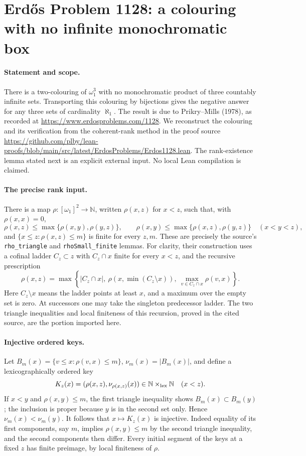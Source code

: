 \section*{Erd\H{o}s Problem 1128: a colouring with no infinite monochromatic box}

\paragraph{Statement and scope.}
There is a two-colouring of \(\omega_1^3\) with no monochromatic product of three countably infinite sets. Transporting this colouring by bijections gives the negative answer for any three sets of cardinality \(\aleph_1\).
The result is due to Prikry--Mills (1978), as recorded at \url{https://www.erdosproblems.com/1128}.
We reconstruct the colouring and its verification from the coherent-rank method in the proof source
\url{https://github.com/plby/lean-proofs/blob/main/src/latest/ErdosProblems/Erdos1128.lean}.
The rank-existence lemma stated next is an explicit external input. No local Lean compilation is claimed.

\paragraph{The precise rank input.}
There is a map \(\rho:[\omega_1]^2\to\mathbb N\), written \(\rho(x,z)\) for \(x<z\), such that, with \(\rho(x,x)=0\),
\[
 \rho(x,z)\leq\max\{\rho(x,y),\rho(y,z)\},\qquad
 \rho(x,y)\leq\max\{\rho(x,z),\rho(y,z)\}
 \quad(x<y<z),
\]
and \(\{x\leq z:\rho(x,z)\leq m\}\) is finite for every \(z,m\).
These are precisely the source's \texttt{rho\_triangle} and \texttt{rhoSmall\_finite} lemmas.
For clarity, their construction uses a cofinal ladder \(C_z\subset z\) with \(C_z\cap x\) finite for every \(x<z\), and the recursive prescription
\[
 \rho(x,z)=\max\left\{
 |C_z\cap x|,\ 
 \rho(x,\min(C_z\setminus x)),\
 \max_{v\in C_z\cap x}\rho(v,x)\right\}.
\]
Here \(C_z\setminus x\) means the ladder points at least \(x\), and a maximum over the empty set is zero. At successors one may take the singleton predecessor ladder. The two triangle inequalities and local finiteness of this recursion, proved in the cited source, are the portion imported here.

\paragraph{Injective ordered keys.}
Let \(B_m(x)=\{v\leq x:\rho(v,x)\leq m\}\), \(\nu_m(x)=|B_m(x)|\), and define a lexicographically ordered key
\[
 K_z(x)=(\rho(x,z),\nu_{\rho(x,z)}(x))\in\mathbb N\times_{\rm lex}\mathbb N
 \quad(x<z).
\]
If \(x<y\) and \(\rho(x,y)\leq m\), the first triangle inequality shows \(B_m(x)\subset B_m(y)\); the inclusion is proper because \(y\) is in the second set only. Hence \(\nu_m(x)<\nu_m(y)\).
It follows that \(x\mapsto K_z(x)\) is injective. Indeed equality of its first components, say \(m\), implies \(\rho(x,y)\leq m\) by the second triangle inequality, and the second components then differ.
Every initial segment of the keys at a fixed \(z\) has finite preimage, by local finiteness of \(\rho\).

